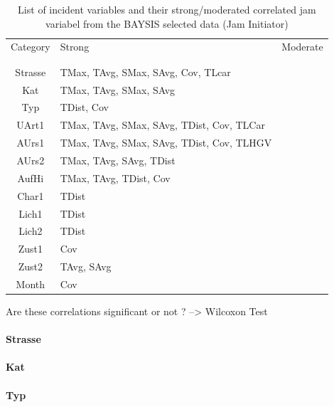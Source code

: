\documentclass[a4paper,headsepline,footsepline,fontsize=11pt,BCOR=12mm,DIV=12]{report}
\begin{document}
\noindent
\begin{table}[h!]
	\centering
	\begin{tabular}{c|l|l}  
		Category & Strong & Moderate \\
		\\[-1em]
		\hline
		\\[-1em]
		Strasse & TMax, TAvg, SMax, SAvg, Cov, TLcar & \\ 
 		Kat & TMax, TAvg, SMax, SAvg & \\ 
 		Typ & TDist, Cov & \\
 		UArt1 & TMax, TAvg, SMax, SAvg, TDist, Cov, TLCar & \\
 		AUrs1 & TMax, TAvg, SMax, SAvg, TDist, Cov, TLHGV & \\
 		AUrs2 & TMax, TAvg, SAvg, TDist & \\
 		AufHi & TMax, TAvg, TDist, Cov & \\
 		Char1 & TDist & \\
 		Lich1 & TDist & \\
 		Lich2 & TDist & \\
 		Zust1 & Cov & \\
 		Zust2 & TAvg, SAvg & \\
 		Month & Cov & \\
	\end{tabular}
	\caption{List of incident variables and their strong/moderated correlated jam variabel from the BAYSIS selected data (Jam Initiator)}
\end{table}

Are these correlations significant or not ? --> Wilcoxon Test

\paragraph{Strasse}

\paragraph{Kat}

\paragraph{Typ}
\end{document}
